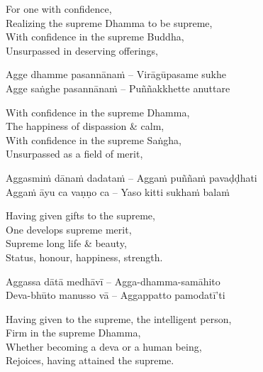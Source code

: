 \begin{english}
  For one with confidence,\\
  Realizing the supreme Dhamma to be supreme,\\
  With confidence in the supreme Buddha,\\
  Unsurpassed in deserving offerings,
\end{english}

\begin{twochants}
  Agge dhamme pasannānaṁ – Virāgūpasame sukhe\\
  Agge saṅghe pasannānaṁ – Puññakkhette anuttare\\
\end{twochants}

\begin{english}
  With confidence in the supreme Dhamma,\\
  The happiness of dispassion \& calm,\\
  With confidence in the supreme Saṅgha,\\
  Unsurpassed as a field of merit,
\end{english}

\begin{twochants}
  Aggasmiṁ dānaṁ dadataṁ – Aggaṁ puññaṁ pavaḍḍhati\\
  Aggaṁ āyu ca vaṇṇo ca – Yaso kitti sukhaṁ balaṁ
\end{twochants}

\begin{english}
  Having given gifts to the supreme,\\
  One develops supreme merit,\\
  Supreme long life \& beauty,\\
  Status, honour, happiness, strength.
\end{english}

\begin{twochants}
  Aggassa dātā medhāvī – Agga-dhamma-samāhito\\
  Deva-bhūto manusso vā – Aggappatto pamodatī'ti
\end{twochants}

\begin{english}
  Having given to the supreme, the intelligent person,\\
  Firm in the supreme Dhamma,\\
  Whether becoming a deva or a human being,\\
  Rejoices, having attained the supreme.
\end{english}

